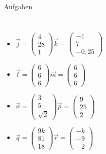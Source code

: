 \documentclass[11pt, aspectratio=169]{beamer}
\begin{document}
\begin{frame}{Aufgaben}
\begin{columns}
			\begin{itemize}
				\item $\vec{j} = \left( \begin{array}{c} 4 \\ 28 \\ 1 \end{array} \right) \vec{k} = \left( \begin{array}{c} -1 \\ 7 \\ -0,25 \end{array} \right)$
				\item $\vec{l} = \left( \begin{array}{c} 6 \\ 6 \\ 6 \end{array} \right) \vec{m} = \left( \begin{array}{c} 6 \\ 6 \\ 6 \end{array} \right)$
				\color{green}
				\uncover<2->{\checkmark, p}
				\color{black}
				\item $\vec{o} = \left( \begin{array}{c} 3 \\ 5 \\ \sqrt{2} \end{array} \right) \vec{p} = \left( \begin{array}{c} 9 \\ 25 \\ 2 \end{array} \right)$
				\item $\vec{q} = \left( \begin{array}{c} 9k \\ 81 \\ 18 \end{array} \right) \vec{r} = \left( \begin{array}{c} -k \\ -9 \\  -2 \end{array} \right)$
				\color{green}
				\uncover<2->{\checkmark, a}
				\color{black}
			\end{itemize}
		\end{columns}
	\end{frame}
\end{document}
